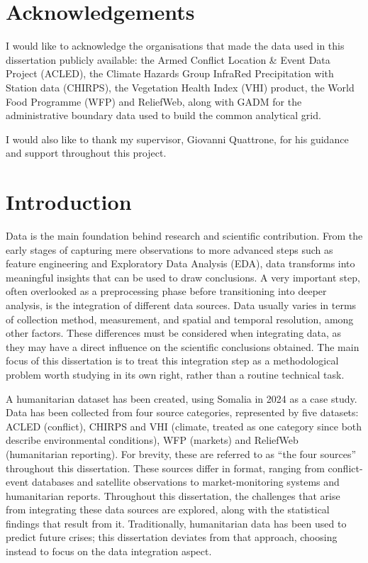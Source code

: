 \documentclass[12pt,a4paper]{article}
\begin{document}
\clearpage
\section*{Acknowledgements}

I would like to acknowledge the organisations that made the data used in this dissertation publicly available: the Armed Conflict Location \& Event Data Project (ACLED), the Climate Hazards Group InfraRed Precipitation with Station data (CHIRPS), the Vegetation Health Index (VHI) product, the World Food Programme (WFP) and ReliefWeb, along with GADM for the administrative boundary data used to build the common analytical grid.

I would also like to thank my supervisor, Giovanni Quattrone, for his guidance and support throughout this project.

\clearpage
\setcounter{tocdepth}{1}
\tableofcontents
\clearpage
\listoftables
\clearpage
\listoffigures
\clearpage

\section{Introduction}

Data is the main foundation behind research and scientific contribution. From the early stages of capturing mere observations to more advanced steps such as feature engineering and Exploratory Data Analysis (EDA), data transforms into meaningful insights that can be used to draw conclusions. A very important step, often overlooked as a preprocessing phase before transitioning into deeper analysis, is the integration of different data sources. Data usually varies in terms of collection method, measurement, and spatial and temporal resolution, among other factors. These differences must be considered when integrating data, as they may have a direct influence on the scientific conclusions obtained. The main focus of this dissertation is to treat this integration step as a methodological problem worth studying in its own right, rather than a routine technical task.

A humanitarian dataset has been created, using Somalia in 2024 as a case study. Data has been collected from four source categories, represented by five datasets: ACLED (conflict), CHIRPS and VHI (climate, treated as one category since both describe environmental conditions), WFP (markets) and ReliefWeb (humanitarian reporting). For brevity, these are referred to as ``the four sources'' throughout this dissertation. These sources differ in format, ranging from conflict-event databases and satellite observations to market-monitoring systems and humanitarian reports. Throughout this dissertation, the challenges that arise from integrating these data sources are explored, along with the statistical findings that result from it. Traditionally, humanitarian data has been used to predict future crises; this dissertation deviates from that approach, choosing instead to focus on the data integration aspect.
\end{document}
